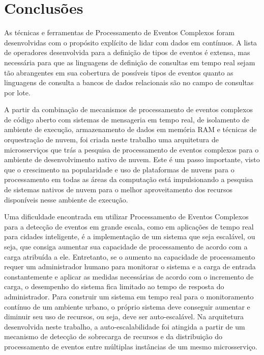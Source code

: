 \chapter{Conclusões}
\label{cap:conclusoes}



As técnicas e ferramentas de Processamento de Eventos Complexos foram desenvolvidas com o propósito explícito de lidar com dados em contínuos. A lista de operadores desenvolvida para a definição de tipos de eventos é extensa, mas necessária para que as linguagens de definição de consultas em tempo real sejam tão abrangentes em sua cobertura de possíveis tipos de eventos quanto as linguagens de consulta a bancos de dados relacionais são no campo de consultas por lote.
\tod

A partir da combinação de mecanismos de processamento de eventos complexos de código aberto com sistemas de mensageria em tempo real, de isolamento de ambiente de execução, armazenamento de dados em memória RAM e técnicas de orquestração de nuvem, foi criada neste trabalho uma arquitetura de microsserviços que trás a pesquisa de processamento de eventos complexos para o ambiente de desenvolvimento nativo de nuvem. Este é um passo importante, visto que o crescimento na popularidade e uso de plataformas de nuvens para o processamento em todas as áreas da computação está impulsionando a pesquisa de sistemas nativos de nuvem para o melhor aproveitamento dos recursos disponíveis nesse ambiente de execução.

Uma dificuldade encontrada em utilizar Processamento de Eventos Complexos para a detecção de eventos em grande escala, como em aplicações de tempo real para cidades inteligente, é a implementação de um sistema que seja escalável, ou seja, que consiga aumentar sua capacidade de processamento de acordo com a carga atribuída a ele. Entretanto, se o aumento na capacidade de processamento requer um administrador humano para monitorar o sistema e a carga de entrada constantemente e aplicar as medidas necessárias de acordo com o incremento de carga, o desempenho do sistema fica limitado ao tempo de resposta do administrador. Para construir um sistema em tempo real para o monitoramento contínuo de um ambiente urbano, o próprio sistema deve conseguir aumentar e diminuir seu uso de recursos, ou seja, deve ser auto-escalável. Na arquitetura desenvolvida neste trabalho, a auto-escalabilidade foi atingida a partir de um mecanismo de detecção de sobrecarga de recursos e da distribuição do processamento de eventos entre múltiplas instâncias de um mesmo microsserviço. 


